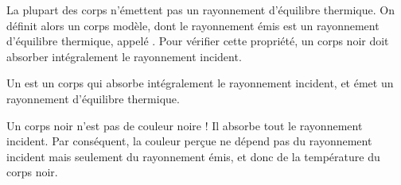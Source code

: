 \documentclass[12pt,fancy]{cours}
\begin{document}
%
%



La plupart des corps n'émettent pas un rayonnement d'équilibre thermique. On définit alors un corps modèle, dont le rayonnement émis est un rayonnement d'équilibre thermique, appelé . Pour vérifier cette propriété, un corps noir doit absorber intégralement le rayonnement incident.
\begin{definition}\label{def:corps_noir}
Un  est un corps qui absorbe intégralement le rayonnement incident, et émet un rayonnement d'équilibre thermique.
\end{definition}
\begin{remarque}
Un corps noir n'est pas de couleur noire ! Il absorbe tout le rayonnement incident. Par conséquent, la couleur perçue ne dépend pas du rayonnement incident mais seulement du rayonnement émis, et donc de la température du corps noir.
\end{remarque}
\end{document}
